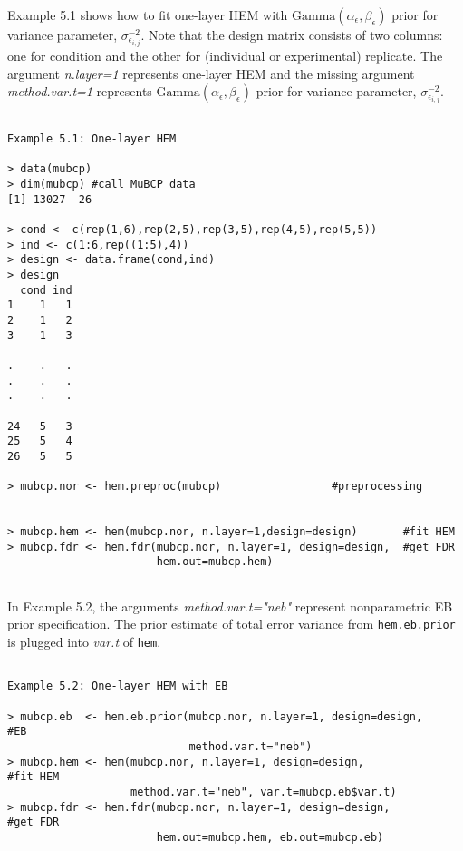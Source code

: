 \documentclass[12pt]{article}
\newcommand{\Rfunction}[1]{{\texttt{#1}}}
\newcommand{\Rfunarg}[1]{{\textit{#1}}}
\begin{document}
Example 5.1 shows how to fit one-layer HEM with $\mbox{Gamma}(\alpha_\epsilon,\beta_\epsilon)$ prior
for variance parameter, $\sigma_{\epsilon_{i,j}}^{-2}$.
Note that the design matrix consists of two columns: 
one for condition and the other for (individual or experimental) replicate. 
The argument \Rfunarg{n.layer=1} represents one-layer HEM and 
the missing argument \Rfunarg{method.var.t=1} represents $\mbox{Gamma}(\alpha_\epsilon,\beta_\epsilon)$ prior
for variance parameter, $\sigma_{\epsilon_{i,j}}^{-2}$.

\begin{verbatim}

Example 5.1: One-layer HEM

> data(mubcp)
> dim(mubcp) #call MuBCP data
[1] 13027  26

> cond <- c(rep(1,6),rep(2,5),rep(3,5),rep(4,5),rep(5,5))
> ind <- c(1:6,rep((1:5),4))
> design <- data.frame(cond,ind)
> design
  cond ind
1    1   1
2    1   2
3    1   3

.    .   .
.    .   .
.    .   .

24   5   3
25   5   4
26   5   5
  
> mubcp.nor <- hem.preproc(mubcp)                 #preprocessing


> mubcp.hem <- hem(mubcp.nor, n.layer=1,design=design)       #fit HEM
> mubcp.fdr <- hem.fdr(mubcp.nor, n.layer=1, design=design,  #get FDR 
                       hem.out=mubcp.hem)


\end{verbatim}

In Example 5.2, the arguments \Rfunarg{method.var.t="neb"}   
represent nonparametric EB prior specification.
The prior estimate of total error variance from \Rfunction{hem.eb.prior} 
is plugged into \Rfunarg{var.t} of \Rfunction{hem}.


\begin{verbatim}

Example 5.2: One-layer HEM with EB

> mubcp.eb  <- hem.eb.prior(mubcp.nor, n.layer=1, design=design,     #EB
                            method.var.t="neb")       
> mubcp.hem <- hem(mubcp.nor, n.layer=1, design=design,              #fit HEM
                   method.var.t="neb", var.t=mubcp.eb$var.t)
> mubcp.fdr <- hem.fdr(mubcp.nor, n.layer=1, design=design,          #get FDR 
                       hem.out=mubcp.hem, eb.out=mubcp.eb)


\end{verbatim}
\end{document}

